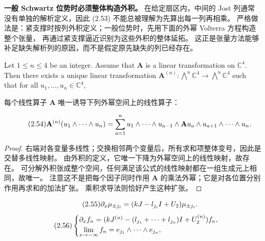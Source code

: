 \begin{note}
\textbf{一般 Schwartz 位势时必须整体构造外积。}
在给定扇区内，中间的 Jost 列通常没有单独的解析定义，因此 (2.53) 不能总被理解为先算出每一列再相乘。
严格做法是：紧支撑时按列外积定义；一般位势时，先用下面的外幂 Volterra 方程构造整个张量，
再通过紧支撑逼近识别为这些外积的整体延拓。
这正是张量方法能够补足缺失解析列的原因，而不是假定原先缺失的列已经存在。
\end{note}
\begin{paperlemmaen}\label{lem:2.2}
Let $1\le n\le4$ be an integer. Assume that $\mathbf A$ is a linear transformation on $\mathbb C^4$.
Then there exists a unique linear transformation $\mathbf A^{(n)}:\bigwedge^n\mathbb C^4\to\bigwedge^n\mathbb C^4$ such that for all $u_1,\ldots,u_n\in\mathbb C^4$,
\end{paperlemmaen}
\begin{paperlemmacn*}
每个线性算子 $\mathbf A$ 唯一诱导下列外幂空间上的线性算子：
\end{paperlemmacn*}
\begin{equation}
\originaleq{2.54}
\mathbf A^{(n)}(u_1\wedge\cdots\wedge u_n)
=\sum\limits_{a=1}^n u_1\wedge\cdots\wedge u_{a-1}
\wedge\mathbf A u_a\wedge u_{a+1}\wedge\cdots\wedge u_n.
\end{equation}
\begin{proof}
右端对各变量多线性；交换相邻两个变量后，所有求和项整体变号，因此是交替多线性映射。
由外积的定义，它唯一下降为外幂空间上的线性映射，故存在。
可分解外积张成整个空间，任何满足该公式的线性映射都在一组生成元上相同，故唯一。
注意这不是把每个因子同时作用 $\mathbf A$ 的乘法外幂；它是对各位置分别作用再求和的加法扩张。
乘积求导法则恰好产生这种扩张。
\end{proof}
\begin{equation}
\originaleq{2.55}
\partial_x\mu_{\pm j_i}=(kJ-l_{j_i}I+U_2)\mu_{\pm j_i}.
\end{equation}
\begin{equation}
\originaleq{2.56}
\begin{cases}
\partial_x f_n=(kJ^{(n)}-(l_{j_1}+\cdots+l_{j_n})I+U_2^{(n)})f_n,\\
\displaystyle\lim\limits_{x\to-\infty}f_n=e_{j_1}\wedge\cdots\wedge e_{j_n},
\end{cases}
\end{equation}
